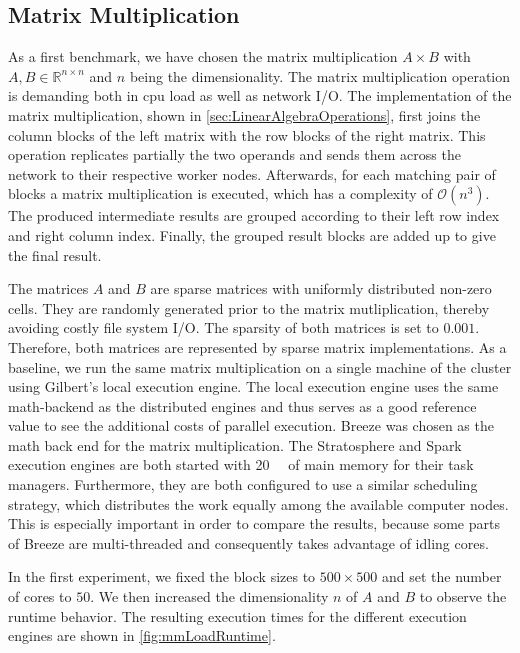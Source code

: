 \subsection{Matrix Multiplication}
\label{subsec:mm}

As a first benchmark, we have chosen the matrix multiplication $A\times B$ with $A,B \in \mathbb{R}^{n\times n}$ and $n$ being the dimensionality.
The matrix multiplication operation is demanding both in cpu load as well as network I/O.
The implementation of the matrix multiplication, shown in \cref{sec:LinearAlgebraOperations}, first joins the column blocks of the left matrix with the row blocks of the right matrix.
This operation replicates partially the two operands and sends them across the network to their respective worker nodes.
Afterwards, for each matching pair of blocks a matrix multiplication is executed, which has a complexity of $\mathcal{O}(n^3)$.
The produced intermediate results are grouped according to their left row index and right column index.
Finally, the grouped result blocks are added up to give the final result.

The matrices $A$ and $B$ are sparse matrices with uniformly distributed non-zero cells.
They are randomly generated prior to the matrix mutliplication, thereby avoiding costly file system I/O.
The sparsity of both matrices is set to $0.001$.
Therefore, both matrices are represented by sparse matrix implementations.
As a baseline, we run the same matrix multiplication on a single machine of the cluster using Gilbert's local execution engine.
The local execution engine uses the same math-backend as the distributed engines and thus serves as a good reference value to see the additional costs of parallel execution.
Breeze was chosen as the math back end for the matrix multiplication.
The Stratosphere and Spark execution engines are both started with \SI{20}{\giga\byte} of main memory for their task managers.
Furthermore, they are both configured to use a similar scheduling strategy, which distributes the work equally among the available computer nodes.
This is especially important in order to compare the results, because some parts of Breeze are multi-threaded and consequently takes advantage of idling cores.

In the first experiment, we fixed the block sizes to $500 \times 500$ and set the number of cores to $50$.
We then increased the dimensionality $n$ of $A$ and $B$ to observe the runtime behavior.
The resulting execution times for the different execution engines are shown in \cref{fig:mmLoadRuntime}.

